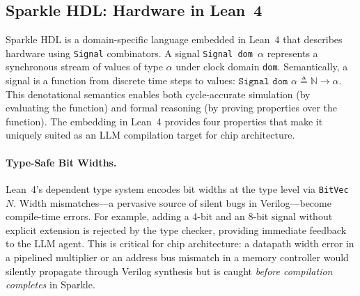 \subsection{Sparkle HDL: Hardware in Lean~4}
\label{sec:sparkle_hdl}

Sparkle HDL is a domain-specific language embedded in Lean~4 that describes hardware using \texttt{Signal} combinators. A signal \texttt{Signal dom $\alpha$} represents a synchronous stream of values of type $\alpha$ under clock domain \texttt{dom}. Semantically, a signal is a function from discrete time steps to values: $\texttt{Signal dom } \alpha \triangleq \mathbb{N} \to \alpha$. This denotational semantics enables both cycle-accurate simulation (by evaluating the function) and formal reasoning (by proving properties over the function). The embedding in Lean~4 provides four properties that make it uniquely suited as an LLM compilation target for chip architecture.

\paragraph{Type-Safe Bit Widths.}
Lean~4's dependent type system encodes bit widths at the type level via \texttt{BitVec $N$}. Width mismatches---a pervasive source of silent bugs in Verilog---become compile-time errors. For example, adding a 4-bit and an 8-bit signal without explicit extension is rejected by the type checker, providing immediate feedback to the LLM agent. This is critical for chip architecture: a datapath width error in a pipelined multiplier or an address bus mismatch in a memory controller would silently propagate through Verilog synthesis but is caught \emph{before compilation completes} in Sparkle.

